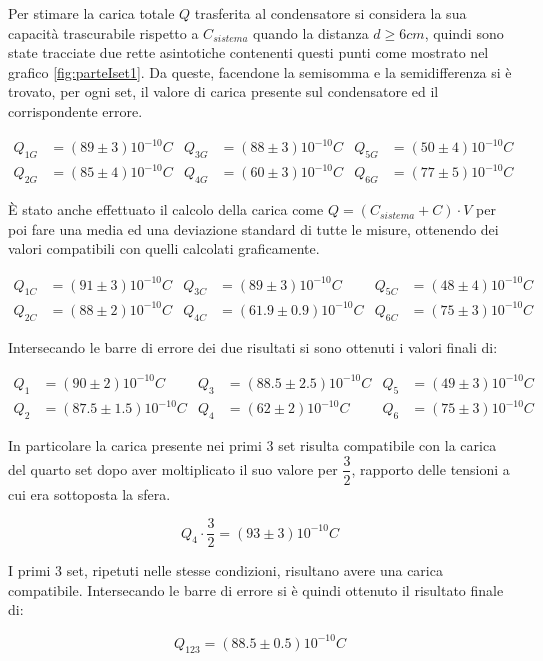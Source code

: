 {Per stimare la carica totale $Q$ trasferita al condensatore si considera la sua capacità trascurabile rispetto a $C_{sistema}$ quando la distanza $d \geq 6 cm$, quindi sono state tracciate due rette asintotiche contenenti questi punti come mostrato nel grafico \ref{fig:parteIset1}. Da queste, facendone la semisomma e la semidifferenza si è trovato, per ogni set, il valore di carica presente sul condensatore ed il corrispondente errore.

\begin{align*}
    Q_{1 G} &= (89 \pm 3) 10^{-10} C    &   Q_{3 G} &= (88 \pm 3) 10^{-10} C    &    Q_{5 G} &= (50 \pm 4) 10^{-10} C\\
    Q_{2 G} &= (85 \pm 4) 10^{-10} C    &   Q_{4 G} &= (60 \pm 3) 10^{-10} C    &    Q_{6 G} &= (77 \pm 5) 10^{-10} C
\end{align*}

È stato anche effettuato il calcolo della carica come $Q = (C_{sistema} + C) \cdot V$ per poi fare una media ed una deviazione standard di tutte le misure, ottenendo dei valori compatibili con quelli calcolati graficamente.

\begin{align*}
    Q_{1 C} &= (91 \pm 3) 10^{-10} C    &   Q_{3 C} &= (89 \pm 3) 10^{-10} C    &    Q_{5 C} &= (48 \pm 4) 10^{-10} C\\
    Q_{2 C} &= (88 \pm 2) 10^{-10} C    &   Q_{4 C} &= (61.9 \pm 0.9) 10^{-10} C    &    Q_{6 C} &= (75 \pm 3) 10^{-10} C
\end{align*}

Intersecando le barre di errore dei due risultati si sono ottenuti i valori finali di:

\begin{align*}
    Q_1 &= (90 \pm 2) 10^{-10} C    &   Q_3 &= (88.5 \pm 2.5) 10^{-10} C    &    Q_5 &= (49 \pm 3) 10^{-10} C\\
    Q_2 &= (87.5 \pm 1.5) 10^{-10} C    &   Q_4 &= (62 \pm 2) 10^{-10} C    &    Q_6 &= (75 \pm 3) 10^{-10} C
\end{align*}

In particolare la carica presente nei primi 3 set risulta compatibile con la carica del quarto set dopo aver moltiplicato il suo valore per $\dfrac{3}{2}$, rapporto delle tensioni a cui era sottoposta la sfera.

\begin{equation*}
    Q_4 \cdot \dfrac{3}{2} = (93 \pm 3) 10^{-10} C 
\end{equation*}

I primi 3 set, ripetuti nelle stesse condizioni, risultano avere una carica compatibile. Intersecando le barre di errore si è quindi ottenuto il risultato finale di:

\begin{equation*}
    Q_{123} = (88.5 \pm 0.5) 10^{-10} C 
\end{equation*}
\par}